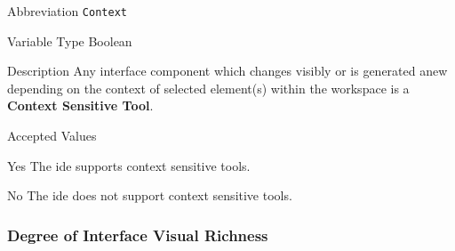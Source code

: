 \begin{AlignedDesc}
  \item[Abbreviation] \texttt{Context}

  \item[Variable Type] Boolean

  \item[Description] Any interface component which changes visibly or is
  generated anew depending on the context of selected element(s) within the
  workspace is a \textbf{Context Sensitive Tool}.

  \item[Accepted Values]

  \begin{AlignedDesc}
    \item[Yes] The \ac{ide} supports context sensitive tools.
    \item[No] The \ac{ide} does not support context sensitive tools.
  \end{AlignedDesc}

\end{AlignedDesc}

\subsubsection{Degree of Interface Visual Richness}
\label{subsec:toolrichness}

